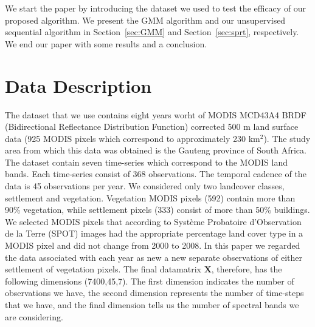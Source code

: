 \documentclass{article}
\begin{document}
We start the paper by introducing the dataset we used to test the efficacy of our proposed algorithm. We present the GMM algorithm and our unsupervised sequential algorithm in Section~\ref{sec:GMM} and 
Section~\ref{sec:sprt}, respectively. We end our paper with some results and a conclusion.
\section{Data Description}
\label{sec:data}
The dataset that we use contains eight years worht of MODIS MCD43A4 BRDF (Bidirectional Reflectance Distribution Function) corrected 500 m land surface
data (925 MODIS pixels which correspond to approximately 230 km$^2$). The study area from which this data was obtained is the Gauteng province of South Africa. The dataset contain seven time-series which correspond to the 
MODIS land bands. Each time-series consist of 368 observations. The temporal cadence of the data is 45 observations per year. We considered only two landcover classes, settlement and vegetation. 
Vegetation MODIS pixels (592) contain more than 90\% vegetation, while settlement pixels (333) consist of more than 50\% buildings. We selected MODIS pixels that according to Système Probatoire d’Observation de la Terre (SPOT) images had the appropriate percentage land cover type in a MODIS pixel and did not change from 2000 to 2008.
In this paper we regarded the data associated with each year as new a new separate observations of either settlement of vegetation pixels. The final datamatrix $\mathbf{X}$, therefore, has the following dimensions (7400,45,7). The first dimension
indicates the number of observations we have, the second dimension represents the number of time-steps that we have, and the final dimension tells us the number of 
spectral bands we are considering.
\end{document}
